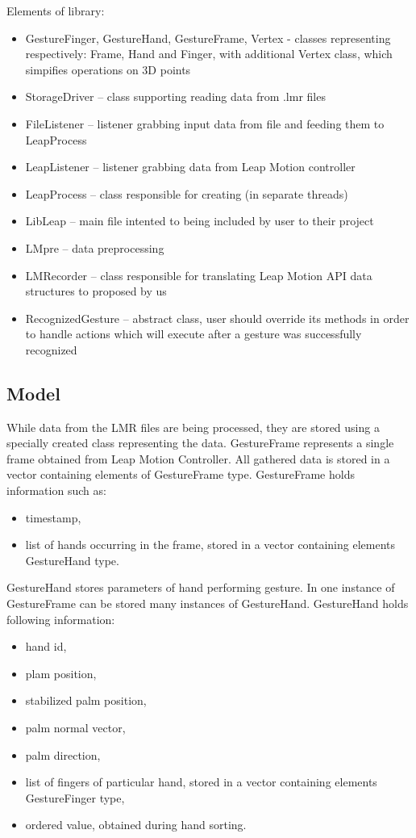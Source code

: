 Elements of library:
\begin{itemize}
\item GestureFinger, GestureHand, GestureFrame, Vertex - classes representing respectively: Frame, Hand and Finger, with additional Vertex class, which simpifies operations on 3D points
\item StorageDriver -- class supporting reading data from .lmr files
\item FileListener -- listener grabbing input data from file and feeding them to LeapProcess
\item LeapListener -- listener grabbing data from Leap Motion controller
\item LeapProcess -- class responsible for creating  (in separate threads)
\item LibLeap -- main file intented to being included by user to their project
\item LMpre -- data preprocessing
\item LMRecorder -- class responsible for translating Leap Motion API data structures to proposed by us
\item RecognizedGesture -- abstract class, user should override its methods in order to handle actions which will execute after a gesture was successfully recognized
\end{itemize}

\subsection{Model}

While data from the LMR files are being processed, they are stored using a specially created class representing the data. GestureFrame represents a single frame obtained from Leap Motion Controller. All gathered data is stored in a vector containing elements of GestureFrame type. GestureFrame holds information such as:

\begin{itemize}
\item timestamp,
\item list of hands occurring in the frame, stored in a vector containing elements GestureHand type.
\end{itemize}

GestureHand stores parameters of hand performing gesture. In one instance of GestureFrame can be stored many instances of GestureHand. GestureHand holds following information:
\begin{itemize}
\item hand id,
\item plam position,
\item stabilized palm position,
\item palm normal vector,
\item palm direction,
\item list of fingers of particular hand, stored in a vector containing elements GestureFinger type,
\item ordered value, obtained during hand sorting.
\end{itemize}

